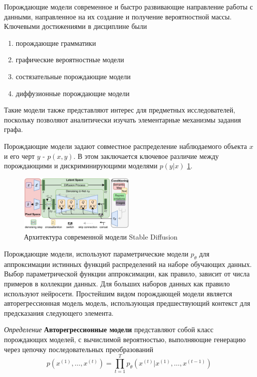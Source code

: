 Порождающие модели современное и быстро развивающие направление работы с данными, направленное на их
создание и получение вероятностной массы. Ключевыми достижениями в дисциплине были \begin{enumerate}
    \item порождающие грамматики \cite{chomsky2002syntactic}
    \item графические вероятностные модели \cite{pearl1988probabilistic}
    \item состязательные порождающие модели \cite{goodfellow2020generative}
    \item диффузионные порождающие модели \cite{song2020score}
\end{enumerate}
Такие модели также представляют интерес для предметных исследователей, поскольку позволяют аналитически изучать
элементарные механизмы задания графа.

Порождающие модели задают совместное распределение наблюдаемого объекта $x$ и его черт $y$ -  $p(x,y)$. В этом заключается 
ключевое различие между порождающими и дискриминирующими моделями $p(y|x)$ \ref{discr_vs_gen}.

\begin{figure}[h]
    \centering
    \includegraphics[width=0.5\textwidth]{assets/ml/generation/stable_diffusion.png}
    \caption{Архитектура современной модели Stable Diffusion}
    \label{discr_vs_gen}
\end{figure}

Порождающие модели, используют параметрические модели $p_\theta$ для аппроксимации истинных функций распределений на наборе обучающих данных.
Выбор параметрической функции аппроксимации, как правило, зависит от числа примеров в коллекции данных. Для больших наборов данных как правило используют нейросети.
Простейшим видом порождающей модели является авторегрессионная модель модель, использующая предшествующий контекст для предсказания следующего элемента.

\textit{Определение } \textbf{Авторегрессионные модели} представляют собой класс порождающих моделей,
с вычислимой  вероятностью, выполняющие генерацию через цепочку последовательных преобразований \begin{equation}
    p(x^{(1)},\dots,x^{(t)}) = \prod_{t=1}^T p_\theta(x^{(t)}|x^{(1)},\dots,x^{(t-1)})
\end{equation}

